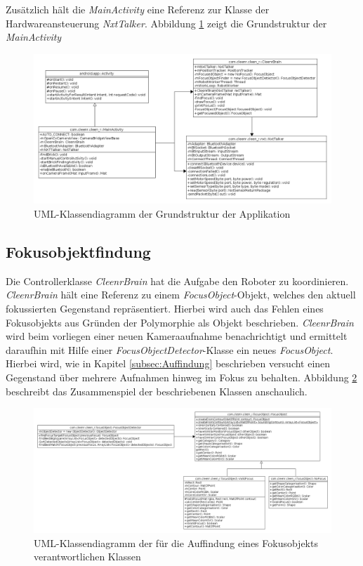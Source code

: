 Zusätzlich hält die \textit{MainActivity} eine Referenz zur Klasse der Hardwareansteuerung \textit{NxtTalker}. Abbildung \ref{fig:UMLActivity} zeigt die Grundstruktur der \textit{MainActivity}

\begin{figure}[h]
\centering
\includegraphics[width=\textwidth]{Bilder/Software/UML/MainActivity}
\caption{UML-Klassendiagramm der Grundstruktur der Applikation}
\label{fig:UMLActivity}
\end{figure}

 
\subsection{Fokusobjektfindung}

Die Controllerklasse \textit{CleenrBrain} hat die Aufgabe den Roboter zu koordinieren. \textit{CleenrBrain} hält eine Referenz zu einem \textit{FocusObject}-Objekt, welches den aktuell fokussierten Gegenstand repräsentiert. Hierbei wird auch das Fehlen eines Fokusobjekts aus Gründen der Polymorphie als Objekt beschrieben. \textit{CleenrBrain} wird beim vorliegen einer neuen Kameraaufnahme benachrichtigt und ermittelt daraufhin mit Hilfe einer \textit{FocusObjectDetector}-Klasse ein neues \textit{FocusObject}. Hierbei wird, wie in Kapitel \ref{subsec:Auffindung} beschrieben versucht einen Gegenstand über mehrere Aufnahmen hinweg im Fokus zu behalten. Abbildung \ref{fig:UMLFocus} beschreibt das Zusammenspiel der beschriebenen Klassen anschaulich.

\begin{figure}[h]
\centering
\includegraphics[width=\textwidth]{Bilder/Software/UML/FocusObjects}
\caption{UML-Klassendiagramm der für die Auffindung eines Fokusobjekts verantwortlichen Klassen}
\label{fig:UMLFocus}
\end{figure}


